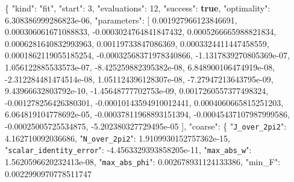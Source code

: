 \documentclass[
  10pt,
]{article}
\newenvironment{Shaded}{}{}
\newcommand{\DataTypeTok}[1]{\textcolor[rgb]{0.56,0.13,0.00}{#1}}
\newcommand{\DecValTok}[1]{\textcolor[rgb]{0.25,0.63,0.44}{#1}}
\newcommand{\FloatTok}[1]{\textcolor[rgb]{0.25,0.63,0.44}{#1}}
\newcommand{\FunctionTok}[1]{\textcolor[rgb]{0.02,0.16,0.49}{#1}}
\newcommand{\KeywordTok}[1]{\textcolor[rgb]{0.00,0.44,0.13}{\textbf{#1}}}
\newcommand{\OtherTok}[1]{\textcolor[rgb]{0.00,0.44,0.13}{#1}}
\newcommand{\StringTok}[1]{\textcolor[rgb]{0.25,0.44,0.63}{#1}}
\begin{document}
\begin{Shaded}
\begin{Highlighting}[]
\FunctionTok{\{}
  \DataTypeTok{"kind"}\FunctionTok{:} \StringTok{"fit"}\FunctionTok{,}
  \DataTypeTok{"start"}\FunctionTok{:} \DecValTok{3}\FunctionTok{,}
  \DataTypeTok{"evaluations"}\FunctionTok{:} \DecValTok{12}\FunctionTok{,}
  \DataTypeTok{"success"}\FunctionTok{:} \KeywordTok{true}\FunctionTok{,}
  \DataTypeTok{"optimality"}\FunctionTok{:} \FloatTok{6.308386999286823e{-}06}\FunctionTok{,}
  \DataTypeTok{"parameters"}\FunctionTok{:} \OtherTok{[}
    \FloatTok{0.001927966123846691}\OtherTok{,}
    \FloatTok{0.000306061671088833}\OtherTok{,}
    \FloatTok{{-}0.0003024764841847432}\OtherTok{,}
    \FloatTok{0.0005266665988821834}\OtherTok{,}
    \FloatTok{0.0006281640832993963}\OtherTok{,}
    \FloatTok{0.00119733847086369}\OtherTok{,}
    \FloatTok{0.0003324411447458559}\OtherTok{,}
    \FloatTok{0.0001862119055185254}\OtherTok{,}
    \FloatTok{{-}0.00032568371978340866}\OtherTok{,}
    \FloatTok{{-}1.1317839270805369e{-}07}\OtherTok{,}
    \FloatTok{1.056122885533573e{-}07}\OtherTok{,}
    \FloatTok{{-}8.425259882395382e{-}08}\OtherTok{,}
    \FloatTok{6.848900106474919e{-}08}\OtherTok{,}
    \FloatTok{{-}2.312284481474514e{-}08}\OtherTok{,}
    \FloatTok{1.051124396128307e{-}08}\OtherTok{,}
    \FloatTok{{-}7.27947213643795e{-}09}\OtherTok{,}
    \FloatTok{9.43966632803792e{-}10}\OtherTok{,}
    \FloatTok{{-}1.45648777702753e{-}09}\OtherTok{,}
    \FloatTok{0.0017260557377498324}\OtherTok{,}
    \FloatTok{{-}0.001278256426380301}\OtherTok{,}
    \FloatTok{{-}0.00010143594910012441}\OtherTok{,}
    \FloatTok{0.0004060665815251203}\OtherTok{,}
    \FloatTok{6.064819104778692e{-}05}\OtherTok{,}
    \FloatTok{{-}0.00037811968893151394}\OtherTok{,}
    \FloatTok{{-}0.00045437107987999586}\OtherTok{,}
    \FloatTok{{-}0.00025005725534875}\OtherTok{,}
    \FloatTok{{-}5.202380327729495e{-}05}
  \OtherTok{]}\FunctionTok{,}
  \DataTypeTok{"coarse"}\FunctionTok{:} \FunctionTok{\{}
    \DataTypeTok{"\nolinkurl{J_over_2pi2}"}\FunctionTok{:} \FloatTok{4.162710092036686}\FunctionTok{,}
    \DataTypeTok{"\nolinkurl{N_over_2pi2}"}\FunctionTok{:} \FloatTok{1.9109930152757362e{-}15}\FunctionTok{,}
    \DataTypeTok{"\nolinkurl{scalar_identity_error}"}\FunctionTok{:} \FloatTok{{-}4.4563329393858205e{-}11}\FunctionTok{,}
    \DataTypeTok{"\nolinkurl{max_abs_w}"}\FunctionTok{:} \FloatTok{1.5620596620232413e{-}08}\FunctionTok{,}
    \DataTypeTok{"\nolinkurl{max_abs_phi}"}\FunctionTok{:} \FloatTok{0.002678931124133386}\FunctionTok{,}
    \DataTypeTok{"min\_F"}\FunctionTok{:} \FloatTok{0.0022990970778511747}

\end{Highlighting}
\end{Shaded}
\end{document}
